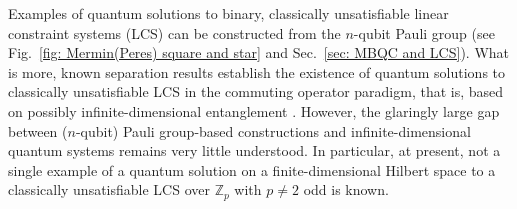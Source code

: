 \documentclass[aps,pra,letterpaper,onrcolumn,nofootinbib,notitlepage,longbibliography]{revtex4-1}
\newcommand{\zz}{\mathbb Z}
\begin{document}
Examples of quantum solutions to binary, classically unsatisfiable linear constraint systems (LCS) can be constructed from the $n$-qubit Pauli group \cite{Mermin1990,Peres1991,Arkhipov2012,TrandafirLisonekCabello2022,MullerGiorgetti2025} (see Fig.~\ref{fig: Mermin(Peres) square and star} and Sec.~\ref{sec: MBQC and LCS}). What is more, known separation results establish the existence of quantum solutions to classically unsatisfiable LCS in the commuting operator paradigm, that is, based on possibly infinite-dimensional entanglement \cite{Slofstra2019,Slofstra2019b,SlofstraPaddock}. However, the glaringly large gap between ($n$-qubit) Pauli group-based constructions and infinite-dimensional quantum systems remains very little understood. In particular, at present, not a single example of a quantum solution on a finite-dimensional Hilbert space to a classically unsatisfiable LCS over $\zz_p$ with $p\neq 2$ odd is known.
\end{document}
